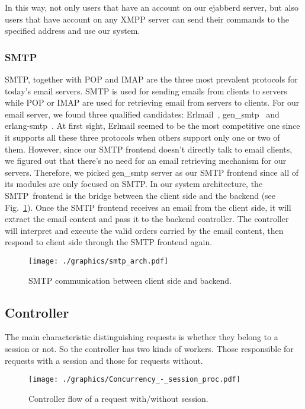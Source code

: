 \documentclass[11pt,a4paper]{report}
\begin{document}
In this way, not only users that have an account on our ejabberd server, but
also users that have account on any XMPP server can send their commands to the
specified address and use our system.

\subsubsection{SMTP}
SMTP, together with POP and IMAP are the three most prevalent protocols for
today's email servers.
SMTP is used for sending emails from clients to servers while POP or IMAP
are used for retrieving email from servers to clients.
For our email server, we found three qualified candidates: Erlmail~\cite{erlmail},
gen\_smtp~\cite{gen_smtp} and erlang-smtp~\cite{erlang-smtp}.
At first sight, Erlmail seemed to be the most competitive one since it
supports all these three protocols when others support only one or two of them.
However, since our SMTP frontend doesn't directly talk to email clients, we
figured out that there's no need for an email retrieving mechanism for our
servers. Therefore, we picked gen\_smtp server as our SMTP frontend since all
of its modules are only focused on SMTP. In our system architecture, the
SMTP~frontend is the bridge between the client side and the backend
(see Fig.~\ref{fig:smtp_arch}).
Once the SMTP frontend receives an email from the client side, it will extract
the email content and pass it to the backend controller. The controller will
interpret and execute the valid orders carried by the email content, then
respond to client side through the SMTP frontend again.

\begin{figure}[h]
 \centering
 \texttt{[image: ./graphics/smtp\_arch.pdf]}
 \caption{SMTP communication between client side and backend.}
 \label{fig:smtp_arch}
\end{figure}

\subsection{Controller}
The main characteristic distinguishing requests is whether they belong to a
session or not.
So the controller has two kinds of workers.
Those responsible for requests with a session and those for requests without.

\begin{figure}[h]
 \centering
 \texttt{[image: ./graphics/Concurrency\_-\_session\_proc.pdf]}
 \vspace{-1cm}
 \caption{Controller flow of a request with/without session.}
 \label{fig:controller:session_proc}
\end{figure}
\end{document}
